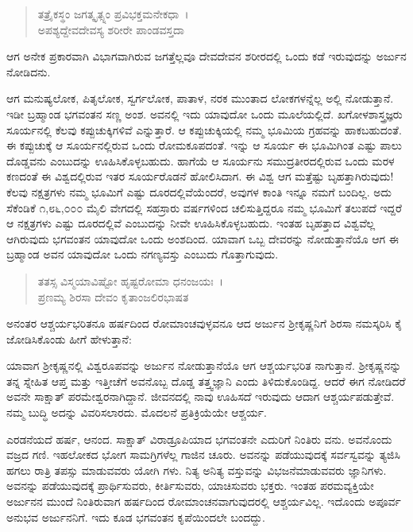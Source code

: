 \begin{verse}
ತತ್ರೈಕಸ್ಥಂ ಜಗತ್ಕೃತ್ಸ್ನಂ ಪ್ರವಿಭಕ್ತಮನೇಕಧಾ~।\\ಅಪಶ್ಯದ್ದೇವದೇವಸ್ಯ ಶರೀರೇ ಪಾಂಡವಸ್ತದಾ 
\end{verse}

{\small ಆಗ ಅನೇಕ ಪ್ರಕಾರವಾಗಿ ವಿಭಾಗವಾಗಿರುವ ಜಗತ್ತೆಲ್ಲವೂ ದೇವದೇವನ ಶರೀರದಲ್ಲಿ ಒಂದು ಕಡೆ ಇರುವುದನ್ನು ಅರ್ಜುನ ನೋಡಿದನು.}

ಆಗ ಮನುಷ್ಯಲೋಕ, ಪಿತೃಲೋಕ, ಸ್ವರ್ಗಲೋಕ, ಪಾತಾಳ, ನರಕ ಮುಂತಾದ ಲೋಕಗಳನ್ನೆಲ್ಲ ಅಲ್ಲಿ ನೋಡುತ್ತಾನೆ. ಇಡೀ ಬ್ರಹ್ಮಾಂಡ ಭಗವಂತನ ಸಣ್ಣ ಅಂಶ. ಅವನಲ್ಲಿ ಇದು ಯಾವುದೋ ಒಂದು ಮೂಲೆಯಲ್ಲಿದೆ. ಖಗೋಳಶಾಸ್ತ್ರಜ್ಞರು ಸೂರ್ಯನಲ್ಲಿ ಕೆಲವು ಕಪ್ಪುಚುಕ್ಕಿಗಳಿವೆ ಎನ್ನುತ್ತಾರೆ. ಆ ಕಪ್ಪುಚುಕ್ಕಿಯಲ್ಲಿ ನಮ್ಮ ಭೂಮಿಯ ಗ್ರಹವನ್ನು ಹಾಕಬಹುದಂತೆ. ಈ ಕಪ್ಪುಚುಕ್ಕೆ ಆ ಸೂರ್ಯನಲ್ಲಿರುವ ಒಂದು ರೋಮಕೂಪದಂತೆ. ಇನ್ನು ಆ ಸೂರ್ಯ ಈ ಭೂಮಿಗಿಂತ ಎಷ್ಟು ಪಾಲು ದೊಡ್ಡವನು ಎಂಬುದನ್ನು ಊಹಿಸಿಕೊಳ್ಳಬಹುದು. ಹಾಗೆಯೆ ಆ ಸೂರ್ಯನು ಸಮುದ್ರತೀರದಲ್ಲಿರುವ ಒಂದು ಮರಳ ಕಣದಂತೆ ಈ ವಿಶ್ವದಲ್ಲಿರುವ ಇತರ ಸೂರ್ಯರೊಡನೆ ಹೋಲಿಸಿದಾಗ. ಈ ವಿಶ್ವ ಆಗ ಮತ್ತೆಷ್ಟು ಬೃಹತ್ತಾಗಿರುವುದು! ಕೆಲವು ನಕ್ಷತ್ರಗಳು ನಮ್ಮ ಭೂಮಿಗೆ ಎಷ್ಟು ದೂರದಲ್ಲಿವೆಯೆಂದರೆ, ಅವುಗಳ ಕಾಂತಿ ಇನ್ನೂ ನಮಗೆ ಬಂದಿಲ್ಲ. ಅದು ಸೆಕೆಂಡಿಕೆ ೧,೮೬,೦೦೦ ಮೈಲಿ ವೇಗದಲ್ಲಿ ಸಹಸ್ರಾರು ವರ್ಷಗಳಿಂದ ಚಲಿಸುತ್ತಿದ್ದರೂ ನಮ್ಮ ಭೂಮಿಗೆ ತಲುಪದೆ ಇದ್ದರೆ ಆ ನಕ್ಷತ್ರಗಳು ಎಷ್ಟು ದೂರದಲ್ಲಿವೆ ಎಂಬುದನ್ನು ನೀವೇ ಊಹಿಸಿಕೊಳ್ಳಬಹುದು. ಇಂತಹ ಬೃಹತ್ತಾದ ವಿಶ್ವವೆಲ್ಲ ಆಗಿರುವುದು ಭಗವಂತನ ಯಾವುದೋ ಒಂದು ಅಂಶದಿಂದ. ಯಾವಾಗ ಒಬ್ಬ ದೇವರನ್ನು ನೋಡುತ್ತಾನೆಯೊ ಆಗ ಈ ಬ್ರಹ್ಮಾಂಡ ಅವನ ಯಾವುದೋ ಒಂದು ನಗಣ್ಯವಸ್ತು ಎಂಬುದು ಗೊತ್ತಾಗುವುದು.

\begin{verse}
ತತಸ್ಸ ವಿಸ್ಮಯಾವಿಷ್ಟೋ ಹೃಷ್ಟರೋಮಾ ಧನಂಜಯಃ~।\\ಪ್ರಣಮ್ಯ ಶಿರಸಾ ದೇವಂ ಕೃತಾಂಜಲಿರಭಾಷತ 
\end{verse}

{\small ಅನಂತರ ಆಶ್ಚರ್ಯಭರಿತನೂ ಹರ್ಷದಿಂದ ರೋಮಾಂಚವುಳ್ಳವನೂ ಆದ ಅರ್ಜುನ ಶ‍್ರೀಕೃಷ್ಣನಿಗೆ ಶಿರಸಾ ನಮಸ್ಕರಿಸಿ ಕೈ ಜೋಡಿಸಿಕೊಂಡು ಹೀಗೆ ಹೇಳುತ್ತಾನೆ:}

ಯಾವಾಗ ಶ‍್ರೀಕೃಷ್ಣನಲ್ಲಿ ವಿಶ್ವರೂಪವನ್ನು ಅರ್ಜುನ ನೋಡುತ್ತಾನೆಯೊ ಆಗ ಆಶ್ಚರ್ಯಭರಿತ ನಾಗುತ್ತಾನೆ. ಶ‍್ರೀಕೃಷ್ಣನನ್ನು ತನ್ನ ಸ್ನೇಹಿತ ಆಪ್ತ ಮತ್ತು ಇತ್ತೀಚೆಗೆ ಅವನೊಬ್ಬ ದೊಡ್ಡ ತತ್ತ್ವಜ್ಞಾನಿ ಎಂದು ತಿಳಿದುಕೊಂಡಿದ್ದ. ಆದರೆ ಈಗ ನೋಡಿದರೆ ಅವನೇ ಸಾಕ್ಷಾತ್ ಪರಮೇಶ್ವರನಾಗಿದ್ದಾನೆ. ಜೀವನದಲ್ಲಿ ನಾವು ಊಹಿಸದೆ ಇರುವುದು ಆದಾಗ ಆಶ್ಚರ್ಯಪಡುತ್ತೇವೆ. ನಮ್ಮ ಬುದ್ಧಿ ಅದನ್ನು ವಿವರಿಸಲಾರದು. ಮೊದಲನೆ ಪ್ರತಿಕ್ರಿಯೆಯೇ ಆಶ್ಚರ್ಯ.

ಎರಡನೆಯದೆ ಹರ್ಷ, ಆನಂದ. ಸಾಕ್ಷಾತ್ ವಿರಾಡ್ರೂಪಿಯಾದ ಭಗವಂತನೇ ಎದುರಿಗೆ ನಿಂತಿರು ವನು. ಅವನೊಂದು ವಜ್ರದ ಗಣಿ. ಇಹಲೋಕದ ಭೋಗ ಸಾಮಗ್ರಿಗಳೆಲ್ಲ ಗಾಜಿನ ಚೂರು. ಅವನನ್ನು ಪಡೆಯುವುದಕ್ಕೆ ಸರ್ವಸ್ವವನ್ನು ತ್ಯಜಿಸಿ ಹಗಲು ರಾತ್ರಿ ತಪಸ್ಸು ಮಾಡುವವರು ಯೋಗಿ ಗಳು. ನಿತ್ಯ ಅನಿತ್ಯ ವಸ್ತುವನ್ನು ವಿಭಜನೆಮಾಡುವವರು ಜ್ಞಾನಿಗಳು. ಅವನನ್ನು ಪಡೆಯುವುದಕ್ಕೆ ಪ್ರಾರ್ಥಿಸುವರು, ಕೀರ್ತಿಸುವರು, ಯಾಚಿಸುವರು ಭಕ್ತರು. ಇಂತಹ ಪರಮವ್ಯಕ್ತಿಯೇ ಅರ್ಜುನನ ಮುಂದೆ ನಿಂತಿರುವಾಗ ಹರ್ಷದಿಂದ ರೋಮಾಂಚನವಾಗುವುದರಲ್ಲಿ ಆಶ್ಚರ್ಯವಿಲ್ಲ. ಇದೊಂದು ಅಪೂರ್ವ ಅನುಭವ ಅರ್ಜುನನಿಗೆ. ಇದು ಕೂಡ ಭಗವಂತನ ಕೃಪೆಯಿಂದಲೇ ಬಂದದ್ದು.

